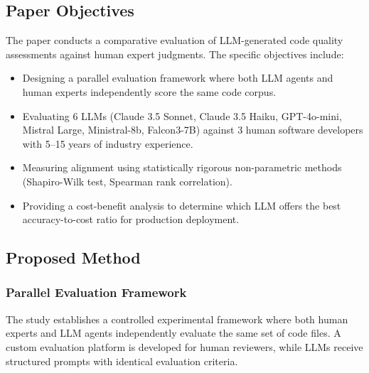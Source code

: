 \subsection{Paper Objectives}
The paper conducts a comparative evaluation of LLM-generated code quality assessments against human expert judgments. The specific objectives include:
\begin{itemize}
    \item Designing a parallel evaluation framework where both LLM agents and human experts independently score the same code corpus.
    \item Evaluating 6 LLMs (Claude 3.5 Sonnet, Claude 3.5 Haiku, GPT-4o-mini, Mistral Large, Ministral-8b, Falcon3-7B) against 3 human software developers with 5--15 years of industry experience.
    \item Measuring alignment using statistically rigorous non-parametric methods (Shapiro-Wilk test, Spearman rank correlation).
    \item Providing a cost-benefit analysis to determine which LLM offers the best accuracy-to-cost ratio for production deployment.
\end{itemize}

\subsection{Proposed Method}

\subsubsection{Parallel Evaluation Framework}
The study establishes a controlled experimental framework where both human experts and LLM agents independently evaluate the same set of code files. A custom evaluation platform is developed for human reviewers, while LLMs receive structured prompts with identical evaluation criteria.

